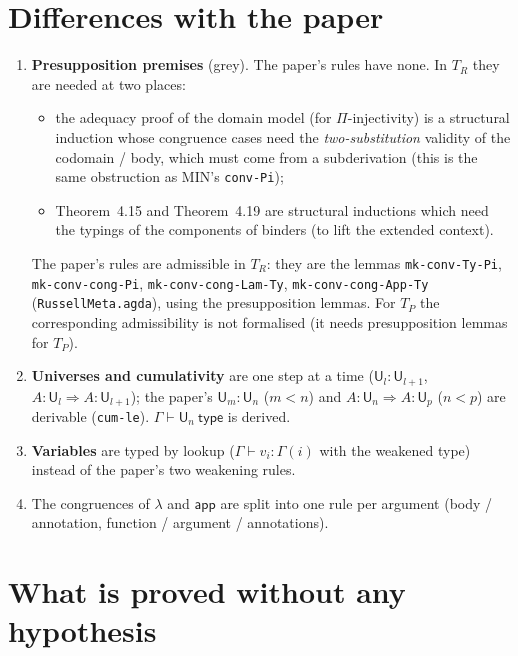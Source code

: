 \documentclass[10pt]{article}
\newcommand{\U}{\mathsf{U}}
\newcommand{\lam}{\lambda}
\newcommand{\app}{\mathsf{app}}
\newcommand{\ty}{\ \mathsf{type}}
\newcommand{\TR}{T_R}
\newcommand{\TP}{T_P}
\newcommand{\agda}[1]{\texttt{#1}}
\theoremstyle{remark}
\begin{document}
\section{Differences with the paper}\label{sec:diff}

\begin{enumerate}
\item \textbf{Presupposition premises} (grey).  The paper's rules have
  none.  In $\TR$ they are needed at two places:
  \begin{itemize}
  \item the adequacy proof of the domain model (for $\Pi$-injectivity) is a
    structural induction whose congruence cases need the
    \emph{two-substitution} validity of the codomain / body, which must come
    from a subderivation (this is the same obstruction as MIN's
    \texttt{conv-Pi});
  \item Theorem~4.15 and Theorem~4.19 are structural inductions which need
    the typings of the components of binders (to lift the extended context).
  \end{itemize}
  The paper's rules are admissible in $\TR$: they are the lemmas
  \agda{mk-conv-Ty-Pi}, \agda{mk-conv-cong-Pi}, \agda{mk-conv-cong-Lam-Ty},
  \agda{mk-conv-cong-App-Ty} (\agda{RussellMeta.agda}), using the
  presupposition lemmas.  For $\TP$ the corresponding admissibility is not
  formalised (it needs presupposition lemmas for $\TP$).
\item \textbf{Universes and cumulativity} are one step at a time
  ($\U_l:\U_{l+1}$, $A:\U_l\Rightarrow A:\U_{l+1}$); the paper's
  $\U_m:\U_n$ ($m<n$) and $A:\U_n\Rightarrow A:\U_p$ ($n<p$) are derivable
  (\agda{cum-le}).  $\Gamma\vdash\U_n\ty$ is derived.
\item \textbf{Variables} are typed by lookup ($\Gamma\vdash v_i:\Gamma(i)$
  with the weakened type) instead of the paper's two weakening rules.
\item The congruences of $\lam$ and $\app$ are split into one rule per
  argument (body / annotation, function / argument / annotations).
\end{enumerate}

\section{What is proved without any hypothesis}
\end{document}
